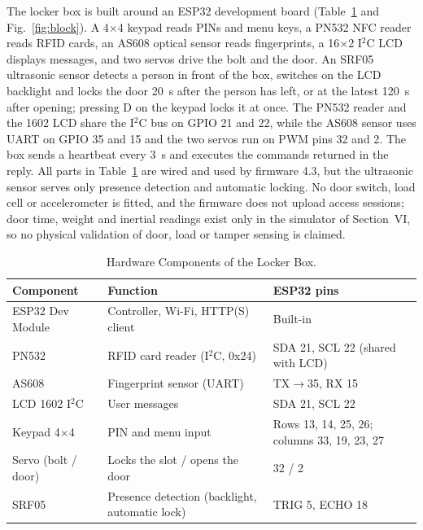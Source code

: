\documentclass[journal,onecolumn]{IEEEtran}
\begin{document}
The locker box is built around an ESP32 development board (Table~\ref{tab:hw} and Fig.~\ref{fig:block}). A 4$\times$4
keypad reads PINs and menu keys, a PN532 NFC reader reads RFID cards, an AS608 optical sensor reads fingerprints, a
16$\times$2 I$^2$C LCD displays messages, and two servos drive the bolt and the door. An SRF05 ultrasonic sensor
detects a person in front of the box, switches on the LCD backlight and locks the door 20~s after the person has left,
or at the latest 120~s after opening; pressing D on the keypad locks it at once. The PN532 reader and the 1602 LCD share
the I$^2$C bus on GPIO 21 and 22, while the AS608 sensor uses UART on GPIO 35 and 15 and the two servos run on PWM pins
32 and 2. The box sends a heartbeat every 3~s and executes the commands returned in the reply. All parts in
Table~\ref{tab:hw} are wired and used by firmware 4.3, but the ultrasonic sensor serves only presence detection and
automatic locking. No door switch, load cell or accelerometer is fitted, and the firmware does not upload access
sessions; door time, weight and inertial readings exist only in the simulator of Section~VI, so no physical
validation of door, load or tamper sensing is claimed.

\begin{table}[!htbp]
\renewcommand{\arraystretch}{1.02}
\centering
\small
\caption{Hardware Components of the Locker Box.}
\label{tab:hw}
\vspace{5pt}
\begin{tabular}{l l l}
\hline
Component & Function & ESP32 pins \\
\hline
\rule{0pt}{2.6ex}ESP32 Dev Module & Controller, Wi-Fi, HTTP(S) client & Built-in \\
PN532 & RFID card reader (I$^2$C, 0x24) & SDA 21, SCL 22 (shared with LCD) \\
AS608 & Fingerprint sensor (UART) & TX$\rightarrow$35, RX 15 \\
LCD 1602 I$^2$C & User messages & SDA 21, SCL 22 \\
Keypad 4$\times$4 & PIN and menu input & Rows 13, 14, 25, 26; columns 33, 19, 23, 27 \\
Servo (bolt / door) & Locks the slot / opens the door & 32 / 2 \\
SRF05 & Presence detection (backlight, automatic lock) & TRIG 5, ECHO 18 \\
\hline
\end{tabular}
\end{table}
\end{document}
